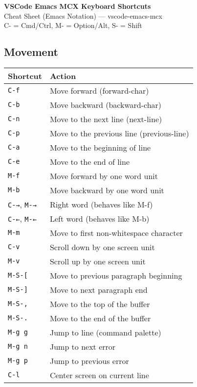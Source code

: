 \documentclass[10pt,landscape]{article}
\newcommand{\key}[1]{\textcolor{keycolor}{\texttt{#1}}}
\begin{document}
\begin{center}
{\huge\textbf{VSCode Emacs MCX Keyboard Shortcuts}}\\
{\large Cheat Sheet (Emacs Notation) --- vscode-emacs-mcx}\\
\vspace{0.5em}
{\small C- = Cmd/Ctrl, M- = Option/Alt, S- = Shift}
\end{center}

\vspace{0.5em}

\begin{multicols}{2}

\section*{\textcolor{sectioncolor}{Movement}}

\begin{tabular}{@{}p{3cm}p{6.5cm}@{}}
\toprule
\textbf{Shortcut} & \textbf{Action} \\
\midrule
\key{C-f} & Move forward (forward-char) \\
\key{C-b} & Move backward (backward-char) \\
\key{C-n} & Move to the next line (next-line) \\
\key{C-p} & Move to the previous line (previous-line) \\
\key{C-a} & Move to the beginning of line \\
\key{C-e} & Move to the end of line \\
\key{M-f} & Move forward by one word unit \\
\key{M-b} & Move backward by one word unit \\
\key{C-→}, \key{M-→} & Right word (behaves like M-f) \\
\key{C-←}, \key{M-←} & Left word (behaves like M-b) \\
\key{M-m} & Move to first non-whitespace character \\
\key{C-v} & Scroll down by one screen unit \\
\key{M-v} & Scroll up by one screen unit \\
\key{M-S-[} & Move to previous paragraph beginning \\
\key{M-S-]} & Move to next paragraph end \\
\key{M-S-,} & Move to the top of the buffer \\
\key{M-S-.} & Move to the end of the buffer \\
\key{M-g g} & Jump to line (command palette) \\
\key{M-g n} & Jump to next error \\
\key{M-g p} & Jump to previous error \\
\key{C-l} & Center screen on current line \\
\bottomrule
\end{tabular}


\end{multicols}
\end{document}
